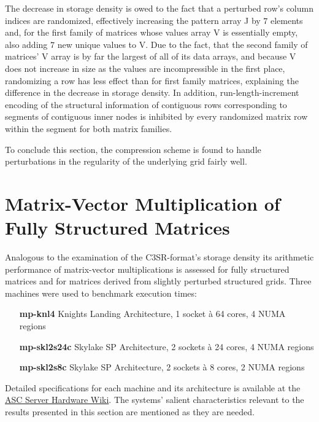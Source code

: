     The decrease in storage density is owed to the fact that a perturbed row's column indices are randomized,
    effectively increasing the pattern array J by $7$ elements and, for the first family of matrices whose values array
    V is essentially empty, also adding $7$ new unique values to V. Due to the fact, that the second family of matrices'
    V array is by far the largest of all of its data arrays, and because V does not increase in size as the values are
    incompressible in the first place, randomizing a row has less effect than for first family matrices, explaining the
    difference in the decrease in storage density. In addition, run-length-increment encoding of the structural
    information of contiguous rows corresponding to segments of contiguous inner nodes is inhibited by every randomized
    matrix row within the segment for both matrix families.

    To conclude this section, the compression scheme is found to handle perturbations in the regularity of the
    underlying grid fairly well.

  \section{Matrix-Vector Multiplication of Fully Structured Matrices} \label{sec:mvm-structured}

    Analogous to the examination of the C3SR-format's storage density its arithmetic performance of matrix-vector
    multiplications is assessed for fully structured matrices and for matrices derived from slightly perturbed
    structured grids. Three machines were used to benchmark execution times: 

    \begin{itemize}[leftmargin=5cm]
      \item[\textbf{mp-knl4}] {Knights Landing Architecture, 1 socket à 64 cores, 4 NUMA regions}
      \item[\textbf{mp-skl2s24c}] {Skylake SP Architecture, 2 sockets à 24 cores, 4 NUMA regions}
      \item[\textbf{mp-skl2s8c}] {Skylake SP Architecture, 2 sockets à 8 cores, 2 NUMA regions} 
    \end{itemize}

    Detailed specifications for each machine and its architecture is available at the \href{\ascWiki}{ASC Server
    Hardware Wiki}. The systems' salient characteristics relevant to the results presented in this section are mentioned
    as they are needed. 

